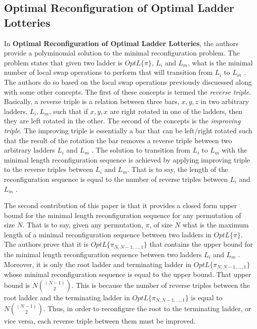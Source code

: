 \subsection{Optimal Reconfiguration of Optimal Ladder Lotteries}
In \textbf{Optimal Reconfiguration of Optimal Ladder Lotteries},
the authors provide a polyminomial solution to the 
minimal reconfiguration problem. The problem states that given 
two ladder is $OptL\{\pi\}$, $L_{i}$ and  $L_{m}$, what is the minimal number of 
local swap operations to perform that will transition from $L_{i}$ to $L_{m}$ \cite{A2}.
The authors do so based on the local swap operations previously 
discuessed along with some other concepts. The first of these concepts 
is termed the \emph{reverse triple}. Basically, a reverse triple is a relation
between three bars, $x,y,z$ in two arbitrary ladders, $L_{i}, L_{m}$, such that if $x,y,x$
are right rotated in one of the ladders, then they are left rotated in the other. 
The second of the concepts is the \emph{improving triple}. The improving triple is 
essentially a bar that can be left/right rotated such that the 
result of the rotation the bar removes a reverse triple between two arbitrary
ladders $L_{i}$ and $L_{m}$ \cite{A2}. The solution to transition from 
$L_{i}$ to $L_{m}$ with the minimal length reconfiguration sequence 
is achieved by applying improving triple to the reverse triples between 
$L_{i}$ and $L_{m}$. That is to say, the length of the reconfiguration sequence 
is equal to the number of reverse triples between $L_{i}$ and  $L_{m}$ \cite{A2}.\par
The second contribution of this paper is that it provides a closed form 
upper bound for the minimal length reconfiguration sequence for any permutation 
of size $N$. That is to say, given any permutation, $\pi$, of size $N$ what is the maximum 
length of a minimal reconfiguration sequence between two ladders in $OptL\{\pi\}$.
The authors prove that it is $OptL\{\pi_{N, N-1, \dots, 1}\}$ that contains the 
upper bound for the minimal length reconfiguration sequence between two ladders $L_{i}$ and 
$L_{m}$ \cite{A2}. Moreover, it is only the root ladder and terminating ladder in 
$OptL\{\pi_{N, N-1, \dots, 1}\}$ whose minimal reconfiguration sequence is equal to 
the upper bound. That upper bound is $N{(N-1) \choose 2}$. This is because 
the number of reverse triples between the root ladder and the terminating ladder 
in $OptL\{\pi_{N, N-1, \dots, 1}\}$ is equal to $N{(N-1) \choose 2}$. Thus, in 
order to reconfigure the root to the terminating ladder, or vice versa, each 
reverse triple between them must be improved.

